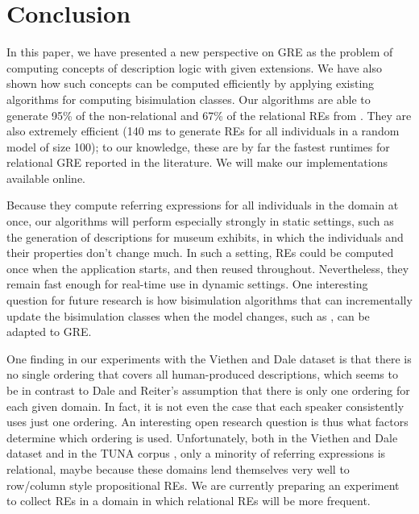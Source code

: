 \section{Conclusion} \label{sec:conclusion}

In this paper, we have presented a new perspective on GRE as the
problem of computing concepts of description logic with given
extensions.  We have also shown how such concepts can be computed
efficiently by applying existing algorithms for computing bisimulation
classes.  Our algorithms are able to generate 95\% of the
non-relational and 67\% of the relational REs from
.  They are also
extremely efficient (140 ms to generate REs for all individuals in a
random model of size 100); to our knowledge, these are by far the
fastest runtimes for relational GRE reported in the literature.  We
will make our implementations available online.

Because they compute referring expressions for all individuals in the
domain at once, our algorithms will perform especially strongly in
static settings, such as the generation of descriptions for museum
exhibits, in which the individuals and their properties don't change
much.  In such a setting, REs could be computed once when the
application starts, and then reused throughout.  Nevertheless, they
remain fast enough for real-time use in dynamic settings.  One
interesting question for future research is how bisimulation
algorithms that can incrementally update the bisimulation classes when
the model changes, such as , can be adapted to GRE.

One finding in our experiments with the Viethen and Dale dataset is
that there is no single ordering that covers all human-produced
descriptions, which seems to be in contrast to Dale and Reiter's
 assumption that there is only one ordering for
each given domain.  In fact, it is not even the case that each speaker
consistently uses just one ordering.  An interesting open research
question is thus what factors determine which ordering is used.
Unfortunately, both in the Viethen and Dale dataset and in the TUNA
corpus \cite{deemter06:_build_seman_trans_corpus_for}, only a minority
of referring expressions is relational, maybe because these domains
lend themselves very well to row/column style propositional REs.  We
are currently preparing an experiment to collect REs in a domain in
which relational REs will be more frequent.

